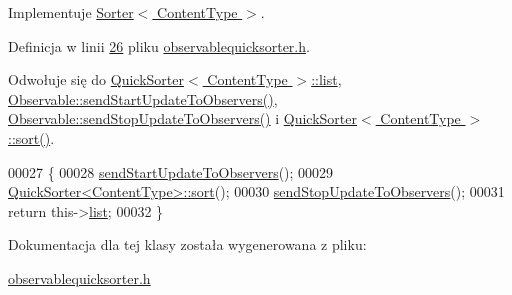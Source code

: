 Implementuje \hyperlink{class_sorter_a880cfd8969b78557ed207ad6f2bd4819}{Sorter$<$ Content\-Type $>$}.



Definicja w linii \hyperlink{observablequicksorter_8h_source_l00026}{26} pliku \hyperlink{observablequicksorter_8h_source}{observablequicksorter.\-h}.



Odwołuje się do \hyperlink{quicksorter_8h_source_l00023}{Quick\-Sorter$<$ Content\-Type $>$\-::list}, \hyperlink{observable_8h_source_l00029}{Observable\-::send\-Start\-Update\-To\-Observers()}, \hyperlink{observable_8h_source_l00039}{Observable\-::send\-Stop\-Update\-To\-Observers()} i \hyperlink{quicksorter_8h_source_l00067}{Quick\-Sorter$<$ Content\-Type $>$\-::sort()}.


\begin{DoxyCode}
00027         \{
00028                 \hyperlink{class_observable_a78df64057f152342a43f27979186a6ba}{sendStartUpdateToObservers}();
00029                 \hyperlink{class_quick_sorter_a86cadfe5f5b9fbdf6e9eacb0b7dbc83d}{QuickSorter<ContentType>::sort}();
00030                 \hyperlink{class_observable_a16f75ed1514a0cb7526b5a5d2b7ca7c6}{sendStopUpdateToObservers}();
00031                 \textcolor{keywordflow}{return} this->\hyperlink{class_quick_sorter_a66cd768b6d8a77952f004be7aad87a0e}{list};
00032         \}
\end{DoxyCode}


Dokumentacja dla tej klasy została wygenerowana z pliku\-:\begin{DoxyCompactItemize}
\item 
\hyperlink{observablequicksorter_8h}{observablequicksorter.\-h}\end{DoxyCompactItemize}
